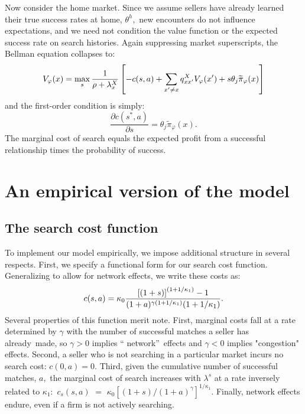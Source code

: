 Now consider the home market. Since we assume sellers have already learned
their true success rates at home, $\theta ^{h},$ new encounters do not
influence expectations, and we need not condition the value function or the
expected success rate on search histories$.$ Again suppressing market
superscripts, the Bellman equation collapses to:%
\begin{equation}
V_{\varphi }(x)=\max_{s}\frac{1}{\rho +\lambda _{x}^{X}}\left[
-c(s,a)+\sum_{x^{\prime }\neq x}q_{xx^{\prime }}^{X}V_{\varphi }(x^{\prime
})+s\theta _{j}\widetilde{\pi }_{\varphi }(x)\right]  \notag
\end{equation}%
and the first-order condition is simply:%
\begin{equation*}
\frac{\partial c(s^{\ast },a)}{\partial s}=\theta _{j}\widetilde{\pi }%
_{\varphi }(x).
\end{equation*}%
The marginal cost of search equals the expected profit from a successful
relationship times the probability of success.

\section{An empirical version of the model}

\subsection{The search cost function}

To implement our model empirically, we impose additional structure in
several respects. First, we specify a functional form for our search cost
function. Generalizing \citet{arkolakis2010market} to allow for network effects, we write these costs as:%
\begin{equation}
c(s,a)=\kappa _{0}\frac{\left[ (1+s)\right] ^{(1+1/\kappa _{1})}-1}{%
(1+a)^{\gamma (1+1/\kappa _{1})}(1+1/\kappa _{1})}.  \label{cost of effort}
\end{equation}%
Several properties of this function merit note. First, marginal costs fall
at a rate determined by $\gamma $ with the number of successful matches a
seller has already\ made, so $\gamma >0$ implies \textquotedblleft
network\textquotedblright\ effects and $\gamma <0$ implies "congestion"
effects.\footnotemark{}
Second, a seller who is not searching in a particular market incurs no
search cost: $c(0,a)=0.$ Third, given the cumulative number of successful
matches, $a,$ the marginal cost of search increases with $\lambda ^{s}$ at a
rate inversely related to $\kappa _{1}:$ $c_{s}(s,a)$ $=$ $\kappa _{0}\left[
(1+s)/(1+a)^{\gamma }\right] ^{1/\kappa _{1}}.$ Finally, network effects
endure, even if a firm is not actively searching.

